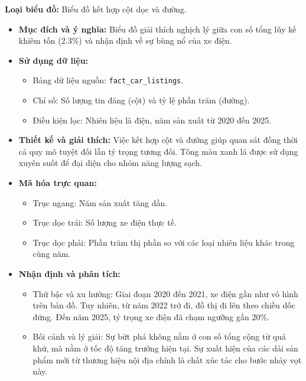 \noindent\textbf{Loại biểu đồ:} Biểu đồ kết hợp cột dọc và đường.

\begin{itemize}
    \item \textbf{Mục đích và ý nghĩa:} Biểu đồ giải thích nghịch lý giữa con số tổng lũy kế khiêm tốn (2.3\%) và nhận định về sự bùng nổ của xe điện.
    
    \item \textbf{Sử dụng dữ liệu:}
    \begin{itemize}
        \item Bảng dữ liệu nguồn: \texttt{fact\_car\_listings}.
        \item Chỉ số: Số lượng tin đăng (cột) và tỷ lệ phần trăm (đường).
        \item Điều kiện lọc: Nhiên liệu là điện, năm sản xuất từ 2020 đến 2025.
    \end{itemize}
    
    \item \textbf{Thiết kế và giải thích:} Việc kết hợp cột và đường giúp quan sát đồng thời cả quy mô tuyệt đối lẫn tỷ trọng tương đối. Tông màu xanh lá được sử dụng xuyên suốt để đại diện cho nhóm năng lượng sạch.
    
    \item \textbf{Mã hóa trực quan:}
    \begin{itemize}
        \item Trục ngang: Năm sản xuất tăng dần.
        \item Trục dọc trái: Số lượng xe điện thực tế.
        \item Trục dọc phải: Phần trăm thị phần so với các loại nhiên liệu khác trong cùng năm.
    \end{itemize}
    
    \item \textbf{Nhận định và phân tích:}
    \begin{itemize}
        \item Thứ bậc và xu hướng: Giai đoạn 2020 đến 2021, xe điện gần như vô hình trên bản đồ. Tuy nhiên, từ năm 2022 trở đi, đồ thị đi lên theo chiều dốc đứng. Đến năm 2025, tỷ trọng xe điện đã chạm ngưỡng gần 20\%. 
        \item Bối cảnh và lý giải: Sự bứt phá không nằm ở con số tổng cộng từ quá khứ, mà nằm ở tốc độ tăng trưởng hiện tại. Sự xuất hiện của các dải sản phẩm mới từ thương hiệu nội địa chính là chất xúc tác cho bước nhảy vọt này.
    \end{itemize}
\end{itemize}


